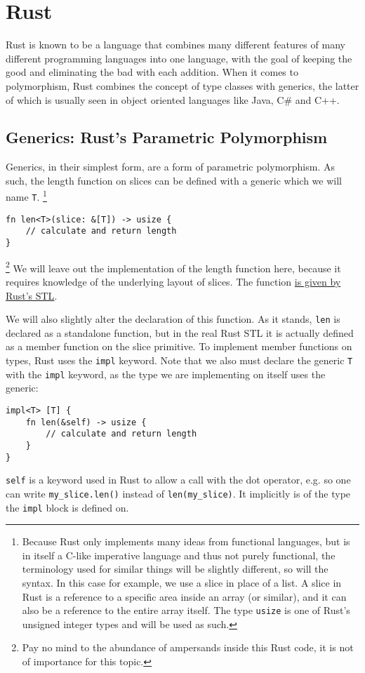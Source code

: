 \section{Rust}

\nocite{rust-book}

Rust is known to be a language that combines many different features of many different programming languages into one language, with the goal of keeping the good and eliminating the bad with each addition.
When it comes to polymorphism, Rust combines the concept of type classes with generics, the latter of which is usually seen in object oriented languages like Java, C\# and C++.

\subsection{Generics: Rust's Parametric Polymorphism}

Generics, in their simplest form, are a form of parametric polymorphism. As such, the length function on slices can be defined with a generic which we will name \verb|T|.
\footnote{Because Rust only implements many ideas from functional languages, but is in itself a C-like imperative language and thus not purely functional, the terminology used for similar things will be slightly different, so will the syntax. In this case for example, we use a slice in place of a list. A slice in Rust is a reference to a specific area inside an array (or similar), and it can also be a reference to the entire array itself. The type \verb|usize| is one of Rust's unsigned integer types and will be used as such.}
\begin{verbatim}
fn len<T>(slice: &[T]) -> usize {
    // calculate and return length
}
\end{verbatim}
\footnote{Pay no mind to the abundance of ampersands inside this Rust code, it is not of importance for this topic.}
We will leave out the implementation of the length function here, because it requires knowledge of the underlying layout of slices. The function \href{https://doc.rust-lang.org/std/primitive.slice.html#method.len}{is given by Rust's STL}.

We will also slightly alter the declaration of this function. As it stands, \verb|len| is declared as a standalone function, but in the real Rust STL it is actually defined as a member function on the slice primitive. To implement member functions on types, Rust uses the \verb|impl| keyword. Note that we also must declare the generic \verb|T| with the \verb|impl| keyword, as the type we are implementing on itself uses the generic:
\begin{verbatim}
impl<T> [T] {
    fn len(&self) -> usize {
        // calculate and return length
    }
}
\end{verbatim}
\verb|self| is a keyword used in Rust to allow a call with the dot operator, e.g. so one can write \verb|my_slice.len()| instead of \verb|len(my_slice)|. It implicitly is of the type the \verb|impl| block is defined on.

